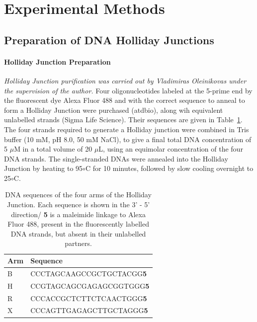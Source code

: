 \section{Experimental Methods}
\subsection{Preparation of DNA Holliday Junctions}
\paragraph{Holliday Junction Preparation}
\emph{Holliday Junction purification was carried out by Vladimiras Oleinikovas under the supervision of the author.}
Four oligonucleotides labeled at the 5-prime end by the fluorescent dye Alexa Fluor 488 and with the correct sequence to anneal to form a Holliday Junction were purchased (atdbio), along wih equivalent unlabelled strands (Sigma Life Science). Their sequences are given in Table~\ref{tab:table1_DNAsequences}. The four strands required to generate a Holliday junction were combined in Tris buffer (10 mM, pH 8.0, 50 mM NaCl), to give a final total DNA concentration of 5 $\mu$M in a total volume of 20 $\mu$L, using an equimolar concentration of the four DNA strands. The single-stranded DNAs were annealed into the Holliday Junction by heating to 95$\circ$C for 10 minutes, followed by slow cooling overnight to 25$\circ$C.

\begin{center}
\begin{table}[!ht]
\caption{DNA sequences of the four arms of the Holliday Junction. Each sequence is shown in the 3' - 5' direction/ {\bf 5} is a maleimide linkage to Alexa Fluor 488, present in the fluorescently labelled DNA strands, but absent in their unlabelled partners.}
\begin{tabular}{|l|l|}
\hline
{\bf Arm} & {\bf Sequence}\\ \hline
B & CCCTAGCAAGCCGCTGCTACGG{\bf 5} \\
H & CCGTAGCAGCGAGAGCGGTGGG{\bf 5} \\
R & CCCACCGCTCTTCTCAACTGGG{\bf 5} \\
X & CCCAGTTGAGAGCTTGCTAGGG{\bf 5} \\ \hline
\end{tabular}
\label{tab:table1_DNAsequences}
\end{table}
\end{center}


